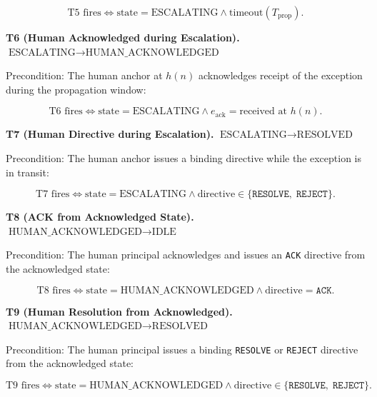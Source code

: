 \begin{equation}
\text{T5 fires} \iff \text{state} = \text{ESCALATING} \land \text{timeout}(T_{\text{prop}}). \tag{T5}
\end{equation}

\bigskip
\noindent\textbf{T6 (Human Acknowledged during Escalation).} $\text{ESCALATING} \rightarrow \text{HUMAN\_ACKNOWLEDGED}$

Precondition: The human anchor at $h(n)$ acknowledges receipt of the exception during the propagation window:

\begin{equation}
\text{T6 fires} \iff \text{state} = \text{ESCALATING} \land e_{\text{ack}} = \text{received at } h(n). \tag{T6}
\end{equation}

\bigskip
\noindent\textbf{T7 (Human Directive during Escalation).} $\text{ESCALATING} \rightarrow \text{RESOLVED}$

Precondition: The human anchor issues a binding directive while the exception is in transit:

\begin{equation}
\text{T7 fires} \iff \text{state} = \text{ESCALATING} \land \text{directive} \in \{\texttt{RESOLVE},\; \texttt{REJECT}\}. \tag{T7}
\end{equation}

\bigskip
\noindent\textbf{T8 (ACK from Acknowledged State).} $\text{HUMAN\_ACKNOWLEDGED} \rightarrow \text{IDLE}$

Precondition: The human principal acknowledges and issues an \texttt{ACK} directive from the acknowledged state:

\begin{equation}
\text{T8 fires} \iff \text{state} = \text{HUMAN\_ACKNOWLEDGED} \land \text{directive} = \texttt{ACK}. \tag{T8}
\end{equation}

\bigskip
\noindent\textbf{T9 (Human Resolution from Acknowledged).} $\text{HUMAN\_ACKNOWLEDGED} \rightarrow \text{RESOLVED}$

Precondition: The human principal issues a binding \texttt{RESOLVE} or \texttt{REJECT} directive from the acknowledged state:

\begin{equation}
\text{T9 fires} \iff \text{state} = \text{HUMAN\_ACKNOWLEDGED} \land \text{directive} \in \{\texttt{RESOLVE},\; \texttt{REJECT}\}. \tag{T9}
\end{equation}

